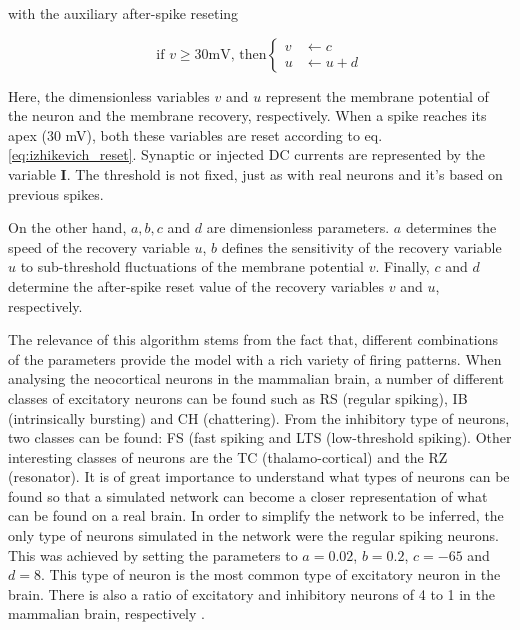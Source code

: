 \documentclass{article}
\begin{document}
with the auxiliary after-spike reseting

\begin{equation}\label{eq:izhikevich_reset}
\text{if } v \geq 30 \text{mV, then}
\begin{cases}
    v     & \leftarrow c \\
    u     & \leftarrow u + d 
  \end{cases}
\end{equation}

Here, the dimensionless variables $v$ and $u$ represent the membrane potential of the neuron and the membrane recovery, respectively. When a spike reaches its apex (30 mV), both these variables are reset according to eq. \ref{eq:izhikevich_reset}. Synaptic or injected DC currents are represented by the variable \textbf{I}. The threshold is not fixed, just as with real neurons and it's based on previous spikes. 

On the other hand, $a, b, c$ and $d$ are dimensionless parameters. $a$ determines the speed of the recovery variable $u$, $b$ defines the sensitivity of the recovery variable $u$ to sub-threshold fluctuations of the membrane potential $v$. Finally, $c$ and $d$ determine the after-spike reset value of the recovery variables $v$ and $u$, respectively. 

The relevance of this algorithm stems from the fact that, different combinations of the parameters provide the model with a rich variety of firing patterns. When analysing the neocortical neurons in the mammalian brain, a number of different classes of excitatory neurons can be found \cite{connors1990intrinsic, gray1996chattering} such as RS (regular spiking), IB (intrinsically bursting) and CH (chattering). From the inhibitory type of neurons, two classes can be found: FS (fast spiking and LTS (low-threshold spiking). Other interesting classes of neurons are the TC (thalamo-cortical) and the RZ (resonator). It is of great importance to understand what types of neurons can be found so that a simulated network can become a closer representation of what can be found on a real brain. In order to simplify the network to be inferred, the only type of neurons simulated in the network were the regular spiking neurons. This was achieved by setting the parameters to $a=0.02$, $b=0.2$, $c=-65$ and $d=8$. This type of neuron is the most common type of excitatory neuron in the brain. There is also a ratio of excitatory and inhibitory neurons of 4 to 1 in the mammalian brain, respectively \cite{izhikevich2003simple}.
\end{document}
